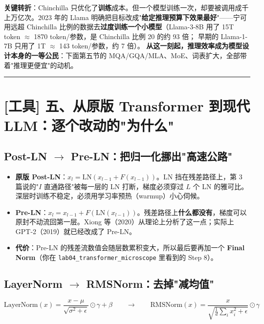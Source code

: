 \textbf{关键转折}：Chinchilla 只优化了\textbf{训练}成本。但一个模型训练一次，却要被调用成千上万亿次。2023 年的 Llama 明确把目标改成"\textbf{给定推理预算下效果最好}"——宁可用远超 Chinchilla 比例的数据去\textbf{过度训练一个小模型}（Llama-3-8B 用了 15T token $\approx$ 1870 token/参数，是 Chinchilla 比例 20 的约 93 倍；
早期的 Llama-1-7B 只用了 1T $\approx$ 143 token/参数，约 7 倍）。
\textbf{从这一刻起，推理效率成为模型设计本身的一等公民}：下面第五节的 MQA/GQA/MLA、MoE、词表扩大，全部带着"推理更便宜"的动机。

\vspace{0.8em}\hrule\vspace{0.8em}

\section{[工具] 五、从原版 Transformer 到现代 LLM：逐个改动的"为什么"}

\subsection{Post-LN \texorpdfstring{$\rightarrow$}{->} Pre-LN：把归一化挪出"高速公路"}

\begin{itemize}
  \item \textbf{原版 Post-LN}：$x_{l} = \text{LN}(x_{l-1} + F(x_{l-1}))$。LN 挡在残差路径上，第 3 篇说的"$I$ 直通路径"被每一层的 LN 打断，梯度必须穿过 $L$ 个 LN 的雅可比。深层时训练不稳定，必须用学习率预热（warmup）小心伺候。
  \item \textbf{Pre-LN}：$x_{l} = x_{l-1} + F(\text{LN}(x_{l-1}))$。残差路径上\textbf{什么都没有}，梯度可以原封不动流回第一层。Xiong 等（2020）从理论上分析了这一点；实际上 GPT-2（2019）就已经改成了 Pre-LN。
  \item \textbf{代价}：Pre-LN 的残差流数值会随层数累积变大，所以最后要再加一个 \textbf{Final Norm}（你在 \texttt{lab04\_transformer\_microscope} 里看到的 Step 8）。
\end{itemize}

\subsection{LayerNorm \texorpdfstring{$\rightarrow$}{->} RMSNorm：去掉"减均值"}

\[
\text{LayerNorm}(x) = \frac{x - \mu}{\sqrt{\sigma^2 + \epsilon}} \odot \gamma + \beta \qquad \longrightarrow \qquad \text{RMSNorm}(x) = \frac{x}{\sqrt{\frac{1}{d}\sum_i x_i^2 + \epsilon}} \odot \gamma
\]

